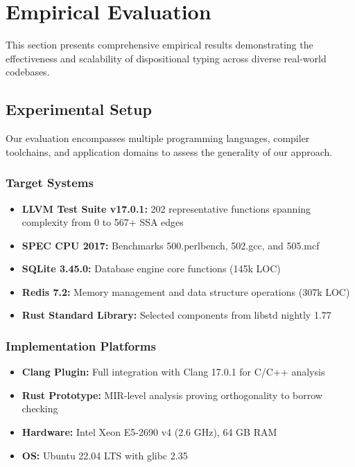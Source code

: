 \documentclass[journal]{IEEEtran}
\begin{document}
\section{Empirical Evaluation}
\label{sec:evaluation}

This section presents comprehensive empirical results demonstrating the effectiveness and scalability of dispositional typing across diverse real-world codebases.

\subsection{Experimental Setup}

Our evaluation encompasses multiple programming languages, compiler toolchains, and application domains to assess the generality of our approach.

\subsubsection{Target Systems}

\begin{itemize}
\item \textbf{LLVM Test Suite v17.0.1:} 202 representative functions spanning complexity from 0 to 567+ SSA edges
\item \textbf{SPEC CPU 2017:} Benchmarks 500.perlbench, 502.gcc, and 505.mcf  
\item \textbf{SQLite 3.45.0:} Database engine core functions (145k LOC)
\item \textbf{Redis 7.2:} Memory management and data structure operations (307k LOC)
\item \textbf{Rust Standard Library:} Selected components from libstd nightly 1.77
\end{itemize}

\subsubsection{Implementation Platforms}

\begin{itemize}
\item \textbf{Clang Plugin:} Full integration with Clang 17.0.1 for C/C++ analysis
\item \textbf{Rust Prototype:} MIR-level analysis proving orthogonality to borrow checking
\item \textbf{Hardware:} Intel Xeon E5-2690 v4 (2.6 GHz), 64 GB RAM
\item \textbf{OS:} Ubuntu 22.04 LTS with glibc 2.35
\end{itemize}
\end{document}
